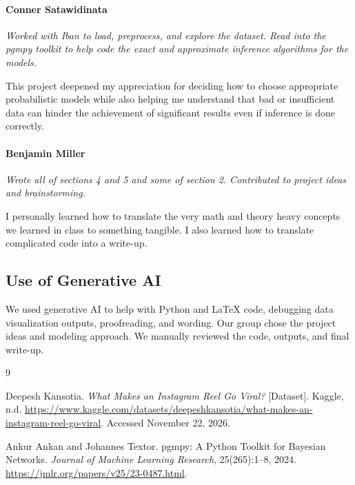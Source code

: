 \documentclass{article}
\begin{document}
\paragraph{Conner Satawidinata}
\textit{Worked with Iban to load, preprocess, and explore the dataset. Read into the pgmpy toolkit to help code the exact and approximate inference algorithms for the models.}\par
This project deepened my appreciation for deciding how to choose appropriate probabilistic models while also helping me understand that bad or insufficient data can hinder the achievement of significant results even if inference is done correctly.

\paragraph{Benjamin Miller}
    \textit{Wrote all of sections 4 and 5 and some of section 2. Contributed to project ideas and brainstorming.}\par
    I personally learned how to translate the very math and theory heavy concepts we learned
    in class to something tangible. I also learned how to translate complicated code into a write-up.

\subsection{Use of Generative AI}
We used generative AI to help with Python and \LaTeX{} code, debugging data visualization outputs,
proofreading, and wording. Our group chose the project ideas and modeling approach. We manually
reviewed the code, outputs, and final write-up.

\renewcommand{\bibsection}{\section{References}}
\begin{thebibliography}{9}
\raggedright

Deepesh Kansotia.
\textit{What Makes an Instagram Reel Go Viral?} [Dataset].
Kaggle, n.d.
\url{https://www.kaggle.com/datasets/deepeshkansotia/what-makes-an-instagram-reel-go-viral}.
Accessed November 22, 2026.

Ankur Ankan and Johannes Textor.
pgmpy: A Python Toolkit for Bayesian Networks.
\textit{Journal of Machine Learning Research}, 25(265):1--8, 2024.
\url{https://jmlr.org/papers/v25/23-0487.html}.

\end{thebibliography}
\end{document}

